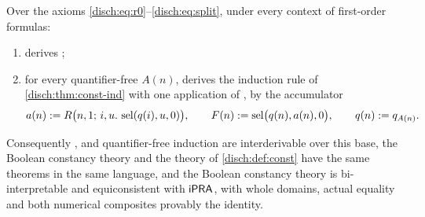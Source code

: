 \begin{proposition}
\label{disch:prop:const-bool}
Over the axioms \eqref{disch:eq:r0}--\eqref{disch:eq:split}, under every
context of first-order formulas:
\begin{enumerate}[label=\textup{(\alph*)}]
\item {} derives ;
\item for every quantifier-free $A(n)$,  derives the
 induction rule of \cref{disch:thm:const-ind} with one application of
 , by the accumulator
 \[
  a(n)\mathrel{:=} R\bigl(n,1;\,i,u.\,\operatorname{sel}(q(i),u,0)\bigr),\qquad
  F(n)\mathrel{:=}\operatorname{sel}\bigl(q(n),a(n),0\bigr),\qquad q(n)\mathrel{:=} q_{A(n)} .
 \]
\end{enumerate}
Consequently ,  and quantifier-free
induction are interderivable over this base, the Boolean constancy theory
and the theory of \cref{disch:def:const} have the same theorems in the same
language, and the Boolean constancy theory is bi-interpretable and
equiconsistent with $\mathsf{iPRA}$, with whole domains, actual equality and both
numerical composites provably the identity.
\end{proposition}

